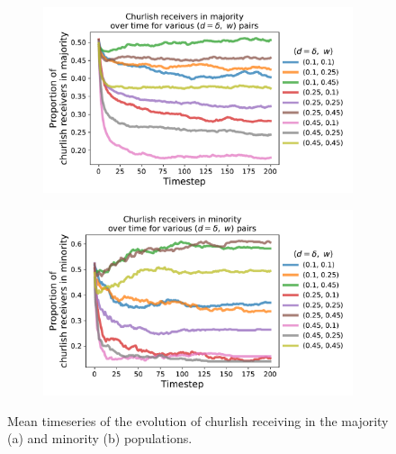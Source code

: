 \documentclass[11pt,letterpaper]{article}
\begin{document}
\begin{figure}[H]
  \centering
  \begin{subfigure}{0.49\textwidth}
    \centering
    \includegraphics[width=\textwidth]{prelim/Figures/churlish_series_majority_005.pdf}
    \caption{}
    \label{fig:}
  \end{subfigure}
  \begin{subfigure}{0.49\textwidth}
    \centering
    \includegraphics[width=\textwidth]{prelim/Figures/churlish_series_minority_005.pdf}
    \caption{}
    \label{fig:}
  \end{subfigure}
  \caption{Mean timeseries of the evolution of churlish receiving in the
    majority (a) and minority (b) populations.}
  \label{fig:regressions}
\end{figure}
\end{document}
